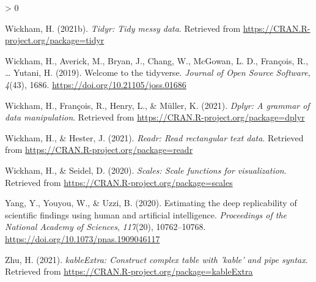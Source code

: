 \documentclass[
  english,
  man,floatsintext]{apa6}
\newlength{\cslhangindent}
\newenvironment{CSLReferences}[2] %
 {%
  \setlength{\parindent}{0pt}
  \ifodd #1 \everypar{\setlength{\hangindent}{\cslhangindent}}\ignorespaces\fi
  \ifnum #2 > 0
  \setlength{\parskip}{#2\baselineskip}
  \fi
 }%
 {}
\begin{document}
\begin{CSLReferences}{1}{0}
\leavevmode\hypertarget{ref-R-tidyr}{}%
Wickham, H. (2021b). \emph{Tidyr: Tidy messy data}. Retrieved from \url{https://CRAN.R-project.org/package=tidyr}

\leavevmode\hypertarget{ref-R-tidyverse}{}%
Wickham, H., Averick, M., Bryan, J., Chang, W., McGowan, L. D., François, R., \ldots{} Yutani, H. (2019). Welcome to the {tidyverse}. \emph{Journal of Open Source Software}, \emph{4}(43), 1686. \url{https://doi.org/10.21105/joss.01686}

\leavevmode\hypertarget{ref-R-dplyr}{}%
Wickham, H., François, R., Henry, L., \& Müller, K. (2021). \emph{Dplyr: A grammar of data manipulation}. Retrieved from \url{https://CRAN.R-project.org/package=dplyr}

\leavevmode\hypertarget{ref-R-readr}{}%
Wickham, H., \& Hester, J. (2021). \emph{Readr: Read rectangular text data}. Retrieved from \url{https://CRAN.R-project.org/package=readr}

\leavevmode\hypertarget{ref-R-scales}{}%
Wickham, H., \& Seidel, D. (2020). \emph{Scales: Scale functions for visualization}. Retrieved from \url{https://CRAN.R-project.org/package=scales}

\leavevmode\hypertarget{ref-yang2020estimating}{}%
Yang, Y., Youyou, W., \& Uzzi, B. (2020). Estimating the deep replicability of scientific findings using human and artificial intelligence. \emph{Proceedings of the National Academy of Sciences}, \emph{117}(20), 10762--10768. \url{https://doi.org/10.1073/pnas.1909046117}

\leavevmode\hypertarget{ref-R-kableExtra}{}%
Zhu, H. (2021). \emph{kableExtra: Construct complex table with 'kable' and pipe syntax}. Retrieved from \url{https://CRAN.R-project.org/package=kableExtra}

\end{CSLReferences}

\endgroup


\clearpage
\renewcommand{\listfigurename}{Figure captions}
\end{document}
